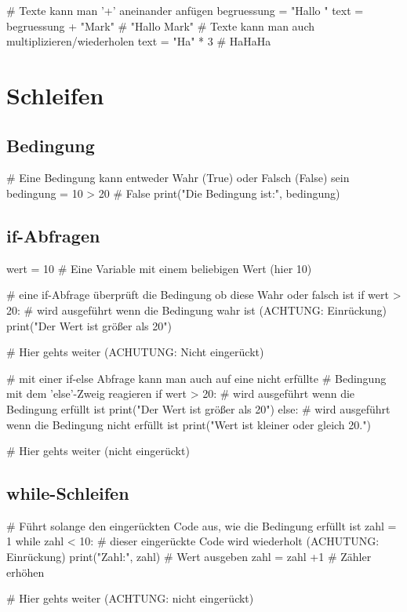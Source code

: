 \documentclass{\VorlagenPfad/coderdojokatext}
\begin{document}
\begin{pythoncode}
# Texte kann man '+' aneinander anfügen
begruessung  = "Hallo "
text = begruessung + "Mark" # "Hallo Mark"
# Texte kann man auch multiplizieren/wiederholen
text = "Ha" * 3  # HaHaHa
\end{pythoncode}

\section{Schleifen}

\subsection{Bedingung}
\begin{pythoncode}
# Eine Bedingung kann entweder Wahr (True) oder Falsch (False) sein
bedingung = 10 > 20 # False
print("Die Bedingung ist:", bedingung)
\end{pythoncode}

\subsection{if-Abfragen}
\begin{pythoncode}
wert = 10 # Eine Variable mit einem beliebigen Wert (hier 10)

# eine if-Abfrage überprüft die Bedingung ob diese Wahr oder falsch ist
if wert > 20: 
	# wird ausgeführt wenn die Bedingung wahr ist (ACHTUNG: Einrückung)
	print("Der Wert ist größer als 20")

# Hier gehts weiter (ACHUTUNG: Nicht eingerückt)
\end{pythoncode}

\begin{pythoncode}
# mit einer if-else Abfrage kann man auch auf eine nicht erfüllte
# Bedingung mit dem 'else'-Zweig reagieren
if wert > 20: 
	# wird ausgeführt wenn die Bedingung erfüllt ist
	print("Der Wert ist größer als 20") 
else:
	# wird ausgeführt wenn die Bedingung nicht erfüllt ist
	print("Wert ist kleiner oder gleich 20.")

# Hier gehts weiter (nicht eingerückt)
\end{pythoncode}

\subsection{while-Schleifen}
\begin{pythoncode}
# Führt solange den eingerückten Code aus, wie die Bedingung erfüllt ist
zahl = 1
while zahl < 10: 
	# dieser eingerückte Code wird wiederholt (ACHUTUNG: Einrückung)
	print("Zahl:", zahl) # Wert ausgeben
	zahl = zahl +1 # Zähler erhöhen

# Hier gehts weiter (ACHTUNG: nicht eingerückt)
\end{pythoncode}
\end{document}
